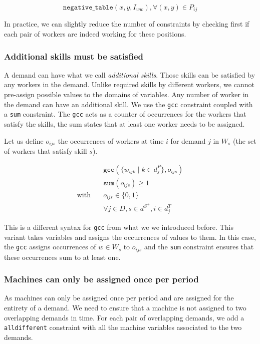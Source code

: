 \documentclass[../../thesis.tex]{subfiles}
\begin{document}
\begin{equation}
  \texttt{negative\_table}(x, y, I_{ww}),  \forall (x, y) \in P_{ij}
\end{equation}

In practice, we can slightly reduce the number of constraints by checking first if each pair of workers are indeed working for these positions.

\subsubsection{Additional skills must be satisfied}

A demand can have what we call \emph{additional skills}. Those skills can be 
satisfied by any workers in the demand. Unlike required skills by different workers,
we cannot pre-assign possible values to the domains of variables. Any number of worker in the demand can have an additional skill.
We use the \texttt{gcc} constraint coupled with a \texttt{sum} constraint.
The \texttt{gcc} acts as a counter of occurrences for the workers that satisfy the skills,
the sum states that at least one worker needs to be assigned.

Let us define $o_{ijs}$ the occurrences of workers at time $i$ for demand $j$ in $W_s$ (the set of workers that satisfy skill $s$).

\begin{align}
  &\texttt{gcc}(\{ w_{ijk} \mid k \in d^P_j \}, o_{ijs}) \\ 
  &\texttt{sum}(o_{ijs}) \geq 1 \\
  \text{with} \quad & o_{ijs} \in \{ 0, 1 \} \\
  & \forall j \in D, s \in d^{S^{+}}, i \in d^T_j
\end{align}

This is a different syntax for \texttt{gcc} from what we we introduced before. This variant takes 
variables and assigns the occurrences of values to them. In this case, the \texttt{gcc} assigns 
occurrences of $w \in W_s$ to $o_{ijs}$ and the \texttt{sum} constraint ensures that 
these occurrences sum to at least one.


\subsubsection{Machines can only be assigned once per period}

As machines can only be assigned once per period and are assigned for the entirety of a demand. We need 
to ensure that a machine is not assigned to two overlapping demands in time.
For each pair of overlapping demands,
we add a \texttt{alldifferent} constraint with all the machine variables associated to the two demands.
\end{document}
